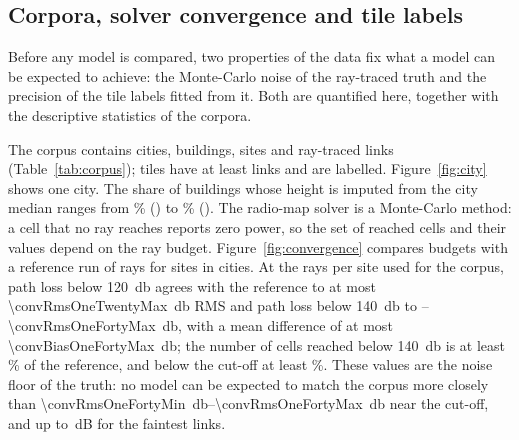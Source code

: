 \begin{table}[!tp]
\centering
\caption{Wall-clock time of the analysis stages of \texttt{make reproduce}
on the machine of Section~\ref{sec:setting} (\rtCpus{} cores,
\rtMachine). Runs: executions of a stage (one per band or per tile size
where it is repeated). The ray tracing of the corpora is separate
(\rtHours{}\,h for the main corpus).}
\label{tab:runtime}
\footnotesize
%
\end{table}

\subsection{Corpora, solver convergence and tile labels}
\label{sec:res-corpus}
\label{sec:res-labels}

Before any model is compared, two properties of the data fix what a model
can be expected to achieve: the Monte-Carlo noise of the ray-traced truth and
the precision of the tile labels fitted from it. Both are quantified here,
together with the descriptive statistics of the corpora.

The corpus contains \nCities{} cities, \nBuildings{} buildings,
\nSites{} sites and \nSamples{} ray-traced links (Table~\ref{tab:corpus});
\nTiles{} tiles have at least \minLinks{} links and are labelled.
Figure~\ref{fig:city} shows one city. The share of buildings whose height
is imputed from the city median ranges from \impMin\% (\impMinCity) to
\impMax\% (\impMaxCity). The radio-map solver is a Monte-Carlo method: a
cell that no ray reaches reports zero power, so the set of reached cells
and their values depend on the ray budget. Figure~\ref{fig:convergence}
compares budgets with a reference run of \convRef{} rays for \convNSites{}
sites in \convNCities{} cities. At the \rtSamples{} rays per site used for
the corpus, path loss below \SI{120}{\decibel} agrees with the reference to
at most \SI{\convRmsOneTwentyMax}{\decibel} RMS and path loss below
\SI{140}{\decibel} to \convRmsOneFortyMin--\SI{\convRmsOneFortyMax}{\decibel},
with a mean difference of at most \SI{\convBiasOneFortyMax}{\decibel}; the
number of cells reached below \SI{140}{\decibel} is at least
\convCellsOneFortyMin\% of the reference, and below the cut-off at least
\convCellsOneFiftyMin\%. These values are the noise floor of the truth:
no model can be expected to match the corpus more closely than
\SIrange{\convRmsOneFortyMin}{\convRmsOneFortyMax}{\decibel} near the
cut-off, and up to \convRmsOneFiftyMax{}\,dB for the faintest links.

